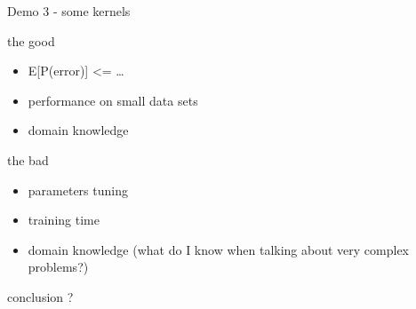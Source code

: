\documentclass[bigger]{beamer}
\begin{document}
\begin{frame}[label=sec-1-11]{Demo 3 - some kernels}
\end{frame}

\begin{frame}[label=sec-1-12]{the good}
\begin{itemize}
\item E[P(error)] <= \ldots{}
\item performance on small data sets
\item domain knowledge
\end{itemize}
\end{frame}

\begin{frame}[label=sec-1-13]{the bad}
\begin{itemize}
\item parameters tuning
\item training time
\item domain knowledge (what do I know when talking about very complex problems?)
\end{itemize}
\end{frame}

\begin{frame}[label=sec-1-14]{conclusion}
?
\end{frame}
\end{document}
